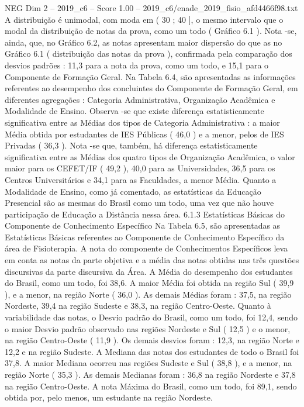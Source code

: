 \begin{textsample}{NEG Dim 2 – 2019\_c6 – Score 1.00 – 2019\_c6/enade\_2019\_fisio\_afd4466f98.txt}
A distribuição é unimodal, com moda em ( 30 ; 40 ], o mesmo intervalo que o modal da distribuição de notas da prova, como um todo ( Gráfico 6.1 ).
Nota -se, ainda, que, no Gráfico 6.2, as notas apresentam maior dispersão do que as no Gráfico 6.1 ( distribuição das notas da prova ), confirmada pela comparação dos desvios padrões : 11,3 para a nota da prova, como um todo, e 15,1 para o Componente de Formação Geral.
Na Tabela 6.4, são apresentadas as informações referentes ao desempenho dos concluintes do Componente de Formação Geral, em diferentes agregações : Categoria Administrativa, Organização Acadêmica e Modalidade de Ensino.
Observa -se que existe diferença estatisticamente significativa entre as Médias dos tipos de Categoria Administrativa : a maior Média obtida por estudantes de IES Públicas ( 46,0 ) e a menor, pelos de IES Privadas ( 36,3 ).
Nota -se que, também, há diferença estatisticamente significativa entre as Médias dos quatro tipos de Organização Acadêmica, o valor maior para os CEFET/IF ( 49,2 ), 40,0 para as Universidades, 36,5 para os Centros Universitários e 34,1 para as Faculdades, a menor Média.
Quanto a Modalidade de Ensino, como já comentado, as estatísticas da Educação Presencial são as mesmas do Brasil como um todo, uma vez que não houve participação de Educação a Distância nessa área. 6.1.3 Estatísticas Básicas do Componente de Conhecimento Específico Na Tabela 6.5, são apresentadas as Estatísticas Básicas referentes ao Componente de Conhecimento Específico da área de Fisioterapia.
A nota do componente de Conhecimentos Específicos leva em conta as notas da parte objetiva e a média das notas obtidas nas três questões discursivas da parte discursiva da Área.
A Média do desempenho dos estudantes do Brasil, como um todo, foi 38,6.
A maior Média foi obtida na região Sul ( 39,9 ), e a menor, na região Norte ( 36,0 ).
As demais Médias foram : 37,5, na região Nordeste, 39,4 na região Sudeste e 38,3, na região Centro-Oeste.
Quanto à variabilidade das notas, o Desvio padrão do Brasil, como um todo, foi 12,4, sendo o maior Desvio padrão observado nas regiões Nordeste e Sul ( 12,5 ) e o menor, na região Centro-Oeste ( 11,9 ).
Os demais desvios foram : 12,3, na região Norte e 12,2 e na região Sudeste.
A Mediana das notas dos estudantes de todo o Brasil foi 37,8.
A maior Mediana ocorreu nas regiões Sudeste e Sul ( 38,8 ), e a menor, na região Norte ( 35,3 ).
As demais Medianas foram : 36,8 na região Nordeste e 37,8 na região Centro-Oeste.
A nota Máxima do Brasil, como um todo, foi 89,1, sendo obtida por, pelo menos, um estudante na região Nordeste.

\end{textsample}
